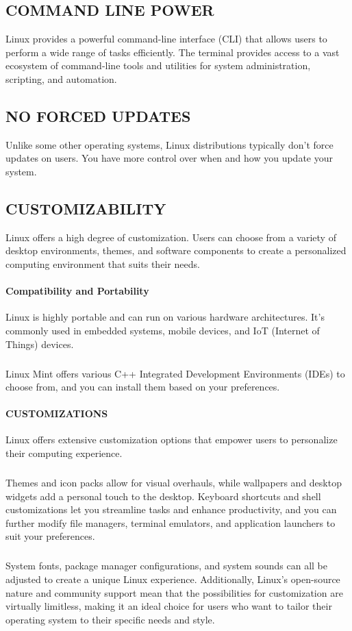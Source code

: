 \documentclass{article}
\begin{document}
\subsection{COMMAND LINE POWER}
 Linux provides a powerful command-line interface (CLI) that allows users to perform a wide range of tasks efficiently. The terminal provides access to a vast ecosystem of command-line tools and utilities for system administration, scripting, and automation.

\subsection{NO FORCED UPDATES}
Unlike some other operating systems, Linux distributions typically don't force updates on users. You have more control over when and how you update your system.

\subsection{CUSTOMIZABILITY}
Linux offers a high degree of customization. Users can choose from a variety of desktop environments, themes, and software components to create a personalized computing environment that suits their needs.
\newpage
{}
\paragraph{Compatibility and Portability}
Linux is highly portable and can run on various hardware architectures. It's commonly used in embedded systems, mobile devices, and IoT (Internet of Things) devices.

\subparagraph{}
Linux Mint offers various C++ Integrated Development Environments (IDEs) to choose from, and you can install them based on your preferences. 

\paragraph{CUSTOMIZATIONS}
Linux offers extensive customization options that empower users to personalize their computing experience.  
\subparagraph{}
Themes and icon packs allow for visual overhauls, while wallpapers and desktop widgets add a personal touch to the desktop. Keyboard shortcuts and shell customizations let you streamline tasks and enhance productivity, and you can further modify file managers, terminal emulators, and application launchers to suit your preferences. 
\subparagraph{}
System fonts, package manager configurations, and system sounds can all be adjusted to create a unique Linux experience. Additionally, Linux's open-source nature and community support mean that the possibilities for customization are virtually limitless, making it an ideal choice for users who want to tailor their operating system to their specific needs and style.
\end{document}
